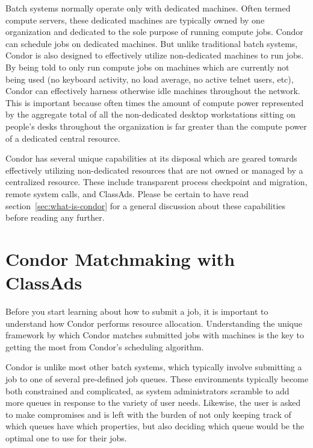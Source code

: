 Batch systems normally operate only with dedicated machines.  Often 
termed compute servers, these dedicated machines are typically owned by
one organization and dedicated to the sole purpose of running compute
jobs.  Condor can schedule jobs on dedicated machines.  But unlike traditional 
batch systems, Condor is also designed to effectively 
utilize non-dedicated machines to run jobs.  By being told to only
run compute jobs on machines which are currently not being used (no keyboard
activity, no load average, no active telnet users, etc), Condor can
effectively harness otherwise idle machines throughout the network.
This is important because often times the amount of
compute power represented by the aggregate total of all the non-dedicated 
desktop workstations sitting on people's desks throughout the
organization is far greater than the compute power of a dedicated
central resource.

Condor has several unique capabilities at its disposal which are geared 
towards effectively utilizing non-dedicated resources that are not owned or
managed by a centralized resource. These include transparent process
checkpoint and migration, remote system calls, and ClassAds.  Please be
certain to have read section~\ref{sec:what-is-condor} for a general 
discussion about these capabilities before reading any further.


\section{Condor Matchmaking with ClassAds}

Before you start learning about how to submit a job, it is important to
understand how Condor performs resource allocation. Understanding the
unique framework by which Condor matches submitted jobs with machines is
the key to getting the most from Condor's scheduling algorithm. 

Condor is unlike most other batch systems, which typically involve
submitting a job to one of several pre-defined job queues. These
environments typically become both constrained and complicated, as
system administrators scramble to add more queues in response to the
variety of user needs. Likewise, the user is asked to make compromises
and is left with the burden of not only keeping track of which queues
have which properties, but also deciding which queue would be the
optimal one to use for their jobs.

